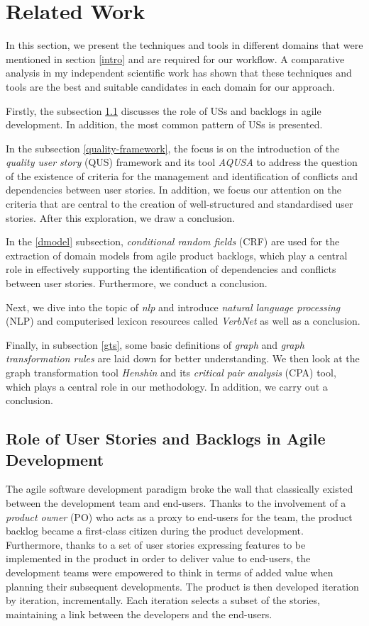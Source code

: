\section{Related Work}\label{related-work}
In this section, we present the techniques and tools in different domains that were mentioned in section \ref{intro} and are required for our workflow. A comparative analysis in my independent scientific work \cite{nejad2023} has shown that these techniques and tools are the best and suitable candidates in each domain for our approach.

Firstly, the subsection \ref{us} discusses the role of USs and backlogs in agile development. In addition, the most common pattern of USs is presented. 

In the subsection \ref{quality-framework}, the focus is on the introduction of the \emph{quality user story} (QUS) framework and its tool \emph{AQUSA} to address the question of the existence of criteria for the management and identification of conflicts and dependencies between user stories. In addition, we focus our attention on the criteria that are central to the creation of well-structured and standardised user stories. After this exploration, we draw a conclusion.

In the \ref{dmodel} subsection, \emph{conditional random fields} (CRF) are used for the extraction of domain models from agile product backlogs, which play a central role in effectively supporting the identification of dependencies and conflicts between user stories. Furthermore, we conduct a conclusion.

Next, we dive into the topic of \emph{nlp} and introduce \emph{natural language processing} (NLP) and computerised lexicon resources called \emph{VerbNet} as well as a conclusion.

Finally, in subsection \ref{gts}, some basic definitions of \emph{graph} and \emph{graph transformation rules} are laid down for better understanding. We then look at the graph transformation tool \emph{Henshin} and its \emph{critical pair analysis} (CPA) tool, which plays a central role in our methodology. In addition, we carry out a conclusion.

\subsection{Role of User Stories and Backlogs in Agile Development}\label{us}
The agile software development paradigm broke the wall that classically existed between the development team and end-users. Thanks to the involvement of a \emph{product owner} (PO) who acts as a proxy to end-users for the team, the product backlog \cite{sedano2019product} became a first-class citizen during the product development. Furthermore, thanks to a set of user stories expressing features to be implemented in the product in order to deliver value to end-users, the development teams were empowered to think in terms of added value when planning their subsequent developments. The product is then developed iteration by iteration, incrementally. Each iteration selects a subset of the stories, maintaining a link between the developers and the end-users\cite{mosser2022modelling}. 

